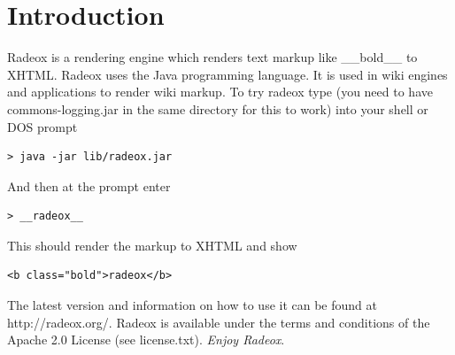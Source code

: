 \documentclass[a4paper,pdftex]{article}
\begin{document}
  
  \thispagestyle{empty}

  {\raggedleft{}
 
   }
 
  \newpage
  \pagestyle{empty}
  \tableofcontents
  \newpage
  \pagestyle{fancy}

\section{Introduction}

Radeox is a  rendering engine which renders text markup like
\_\_bold\_\_ to XHTML. Radeox uses the Java programming
language. It is used in wiki engines and 
applications  to render wiki markup. To try radeox type (you need to have commons-logging.jar in the same directory for 
this to work) into your shell or DOS prompt

\begin{verbatim}
> java -jar lib/radeox.jar
\end{verbatim}

And then at the prompt enter

\begin{verbatim}
> __radeox__
\end{verbatim}

This should render the markup to XHTML and show
\begin{verbatim}
<b class="bold">radeox</b>
\end{verbatim}

The latest version and information on how to use it can be found at http://radeox.org/.
Radeox is available under the terms and conditions of the Apache 2.0 License (see license.txt). {\it Enjoy Radeox}.
\end{document}
